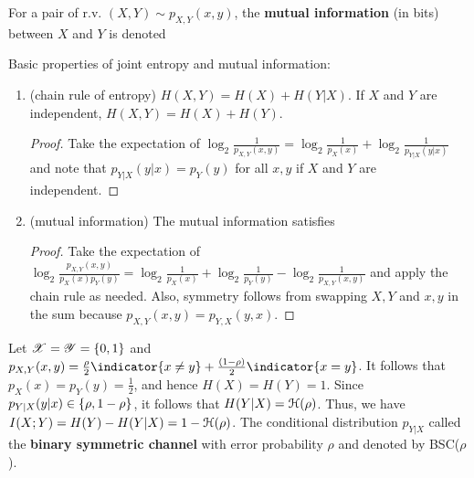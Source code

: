 \documentclass[letterpaper,10pt,english]{article}
\begin{document}
\begin{defn}
For a pair of r.v. $(X, Y ) \sim p_{X,Y}(x, y)$, the \textbf{mutual information} (in bits)
between $X$ and $Y$ is denoted
\end{defn}
\begin{lem}
Basic properties of joint entropy and mutual information:
\begin{enumerate}
\item (chain rule of entropy) $H(X,Y) = H(X)+H(Y|X)$. If $X$ and $Y$ are independent,
$H(X, Y ) = H(X) + H(Y )$.
\begin{proof}
Take the expectation of $\log_2\frac{1}{p_{X,Y}(x,y)} =\log_2\frac{1}{p_X(x)} + \log_2\frac{1}{p_{Y|X}(y|x)}$ and note that $p_{Y |X}(y|x) = p_Y (y)$ for all $x, y$ if $X$ and $Y$ are independent.
\end{proof}
\item (mutual information) The mutual information satisfies 
\begin{proof}
Take the expectation of $\log_2\frac{p_{X,Y}(x,y)}{p_X(x)p_Y(y)} =\log_2\frac{1}{p_X(x)} + \log_2\frac{1}{p_Y(y)}  - \log_2\frac{1}{p_{X,Y}(x,y)}$ and apply the chain rule as needed. 
Also, symmetry follows from swapping $X,Y$ and $x, y$ in the sum because $p_{X,Y} (x, y) = p_{Y,X} (y, x)$. 
\end{proof}
\end{enumerate}
\end{lem} 
\begin{exmp}
Let $\mathscr{X} = \mathscr{Y} = \left\{0, 1\right\}$ and $p_{X,Y}(x, y) = \frac{\rho}{2} \indicator{x \neq y} + \frac{(1 - \rho)}{2}\indicator{x=y}$. 
It follows that $p_X(x)=p_Y(y)= \frac{1}{2}$, and hence $H(X)= H(Y) = 1$. 
Since $p_{Y|X}(y|x) \in \left\{\rho,1-\rho\right\}$, it follows that $H(Y|X)= \mathcal{H}(\rho)$. 
Thus, we have $I(X;Y)=H(Y) - H (Y |X) = 1 - \mathcal{H}(\rho)$. 
The conditional distribution $p_{Y |X}$ called the \textbf{binary symmetric channel} with error probability $\rho$ and denoted by BSC($\rho$).
\end{exmp} 
 
\end{document}
